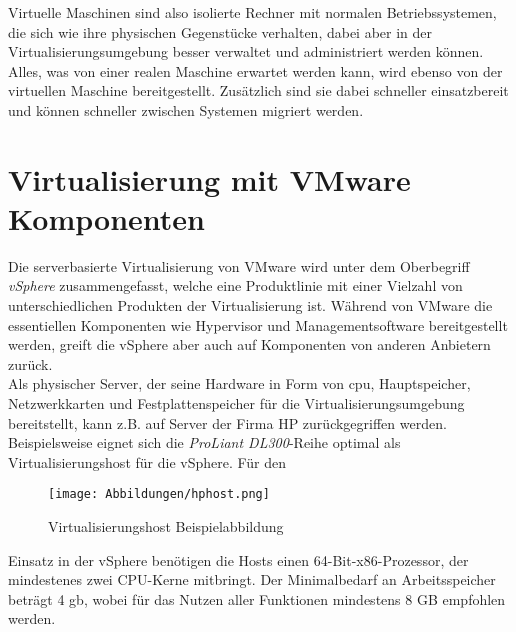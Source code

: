 Virtuelle Maschinen sind also isolierte Rechner mit normalen Betriebssystemen, die sich wie ihre physischen Gegenstücke verhalten, dabei aber in der Virtualisierungsumgebung besser verwaltet und administriert werden können. Alles, was von einer realen Maschine erwartet werden kann, wird ebenso von der virtuellen Maschine bereitgestellt. Zusätzlich sind sie dabei schneller einsatzbereit und können schneller zwischen Systemen migriert werden. \cite[S.~75]{Portnoy2012}
\section{Virtualisierung mit VMware Komponenten}
Die serverbasierte Virtualisierung von VMware wird unter dem Oberbegriff \textit{vSphere} zusammengefasst, welche eine Produktlinie mit einer Vielzahl von unterschiedlichen Produkten der Virtualisierung ist. Während von VMware die essentiellen Komponenten wie Hypervisor und Managementsoftware bereitgestellt werden, greift die vSphere aber auch auf Komponenten von anderen Anbietern zurück. \cite[S.~43]{Wohrmann2018}\medskip\\
Als physischer Server, der seine Hardware in Form von \acrshort{cpu}, Hauptspeicher, Netzwerkkarten und Festplattenspeicher für die Virtualisierungsumgebung bereitstellt, kann z.B. auf Server der Firma HP zurückgegriffen werden. Beispielsweise eignet sich die \textit{ProLiant DL300}-Reihe optimal als Virtualisierungshost für die vSphere. Für den
\begin{wrapfigure}[8]{ht}[0cm]{10cm}
    \centering
    \texttt{[image: Abbildungen/hphost.png]}
    \caption[Virtualisierungshost Beispielabbildung]{Virtualisierungshost Beispielabbildung \footnotemark} 
    \label{fig:Beispielhost}
\end{wrapfigure}
Einsatz in der vSphere benötigen die Hosts einen 64-Bit-x86-Prozessor, der mindestenes zwei CPU-Kerne mitbringt. Der Minimalbedarf an Arbeitsspeicher beträgt 4 \acrshort{gb}, wobei für das Nutzen aller Funktionen mindestens 8 GB empfohlen werden.~\cite[S.~54]{Wohrmann2018}\medskip\\
